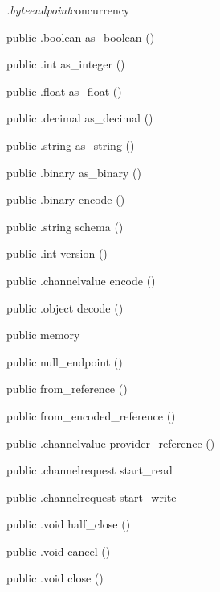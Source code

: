 \begin{CrexxClass}{\textit{.byteendpoint}}{concurrency}
\begin{Members}
    \Method
      {public}
      {.boolean}
      {as\_boolean}
      {()}

    \Method
      {public}
      {.int}
      {as\_integer}
      {()}

    \Method
      {public}
      {.float}
      {as\_float}
      {()}

    \Method
      {public}
      {.decimal}
      {as\_decimal}
      {()}

    \Method
      {public}
      {.string}
      {as\_string}
      {()}

    \Method
      {public}
      {.binary}
      {as\_binary}
      {()}

    \Method
      {public}
      {.binary}
      {encode}
      {()}

    \Method
      {public}
      {.string}
      {schema}
      {()}

    \Method
      {public}
      {.int}
      {version}
      {()}

    \Method
      {public}
      {.channelvalue}
      {encode}
      {()}

    \Method
      {public}
      {.object}
      {decode}
      {()}

    \Factory
      {public}
      {memory}
      {}

    \Factory
      {public}
      {null\_endpoint}
      {()}

    \Factory
      {public}
      {from\_reference}
      {()}

    \Factory
      {public}
      {from\_encoded\_reference}
      {()}

    \Method
      {public}
      {.channelvalue}
      {provider\_reference}
      {()}

    \Method
      {public}
      {.channelrequest}
      {start\_read}
      {}

    \Method
      {public}
      {.channelrequest}
      {start\_write}
      {}

    \Method
      {public}
      {.void}
      {half\_close}
      {()}

    \Method
      {public}
      {.void}
      {cancel}
      {()}

    \Method
      {public}
      {.void}
      {close}
      {()}

  \end{Members}
\end{CrexxClass}

